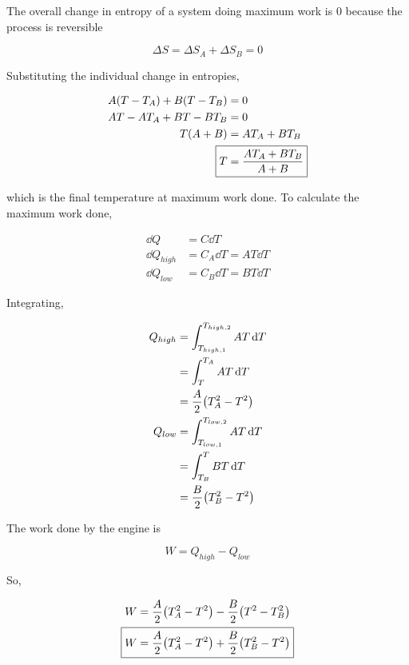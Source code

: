 \documentclass[9pt,a4paper,twocolumn]{article}
\begin{document}
\begin{enumerate}[(a)]
The overall change in entropy of a system doing maximum work is 0 because the process is reversible

\begin{equation}
	\Delta S = \Delta S_A + \Delta S_B = 0
\end{equation}

Substituting the individual change in entropies,

\begin{align}
	A(T - T_A) + B(T - T_B) &= 0 \\
	AT - AT_A + BT - BT_B &= 0 \\
	T(A+B) &= AT_A + BT_B \\
	\Aboxed{
		T &= \frac{AT_A + BT_B}{A+B}
	}
\end{align}

which is the final temperature at maximum work done. To calculate the maximum work done,

\begin{align}
	\dd{Q} &= C\dd{T} \\
	\dd{Q_{high}} &= C_A\dd{T} = AT\dd{T} \\
	\dd{Q_{low}} &= C_B\dd{T} = BT\dd{T}
\end{align}

Integrating,

\begin{align}
	Q_{high} &= \int_{T_{high,1}}^{T_{high,2}} AT\dd{T} \\
	&= \int_T^{T_A} AT\dd{T} \\
	&= \frac{A}{2}\qty(T_A^2 - T^2) \\
	Q_{low} &= \int_{T_{low,1}}^{T_{low,2}} AT\dd{T} \\
	&= \int_{T_B}^T BT\dd{T} \\
	&= \frac{B}{2}\qty(T_B^2 - T^2)
\end{align}

The work done by the engine is

\begin{equation}
	W = Q_{high} - Q_{low}
\end{equation}

So,

\begin{align}
	W &= \frac{A}{2}\qty(T_A^2 - T^2) - \frac{B}{2}\qty(T^2 - T_B^2) \\
	\Aboxed{
		W &= \frac{A}{2}\qty(T_A^2 - T^2) + \frac{B}{2}\qty(T_B^2 - T^2)
	}
\end{align}

\end{enumerate}
\end{document}
